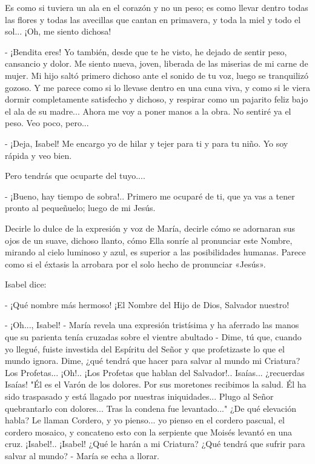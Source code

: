 \documentclass[12pt]{book} %
\begin{document}
Es como si tuviera un ala en el corazón y no un peso; es como llevar dentro todas las flores y todas las avecillas que cantan en primavera, y toda la miel y todo el sol... ¡Oh, me siento dichosa! 

- ¡Bendita eres! Yo también, desde que te he visto, he dejado de sentir peso, cansancio y dolor. Me siento nueva, joven, liberada de las miserias de mi carne de mujer. Mi hijo saltó primero dichoso ante el sonido de tu voz, luego se tranquilizó gozoso. Y me parece como si lo llevase dentro en una cuna viva, y como si le viera dormir completamente satisfecho y dichoso, y respirar como un pajarito feliz bajo el ala de su madre... Ahora me voy a poner manos a la obra. No sentiré ya el peso. Veo poco, pero... 

- ¡Deja, Isabel! Me encargo yo de hilar y tejer para ti y para tu niño. Yo soy rápida y veo bien. 

Pero tendrás que ocuparte del tuyo.... 

- ¡Bueno, hay tiempo de sobra!.. Primero me ocuparé de ti, que ya vas a tener pronto al pequeñuelo; luego de mi Jesús. 

Decirle lo dulce de la expresión y voz de María, decirle cómo se adornaran sus ojos de un suave, dichoso llanto, cómo Ella sonríe al pronunciar este Nombre, mirando al cielo luminoso y azul, es superior a las posibilidades humanas. Parece como si el éxtasis la arrobara por el solo hecho de pronunciar «Jesús». 

Isabel dice: 

- ¡Qué nombre más hermoso! ¡El Nombre del Hijo de Dios, Salvador nuestro! 

- ¡Oh..., Isabel! - María revela una expresión tristísima y ha aferrado las manos que su parienta tenía cruzadas sobre el vientre abultado - Dime, tú que, cuando yo llegué, fuiste investida del Espíritu del Señor y que profetizaste lo que el mundo ignora. Dime, ¿qué tendrá que hacer para salvar al mundo mi Criatura? Los Profetas... ¡Oh!.. ¡Los Profetas que hablan del Salvador!.. Isaías... ¿recuerdas Isaías! "Él es el Varón de los dolores. Por sus moretones recibimos la salud. Él ha sido traspasado y está llagado por nuestras iniquidades... Plugo al Señor quebrantarlo con dolores... Tras la condena fue levantado..." ¿De qué elevación habla? Le llaman Cordero, y yo pienso... yo pienso en el cordero pascual, el cordero mosaico, y concateno esto con la serpiente que Moisés levantó en una cruz. ¡Isabel!.. ¡Isabel! ¿Qué le harán a mi Criatura? ¿Qué tendrá que sufrir para salvar al mundo? - María se echa a llorar. 
\end{document}
